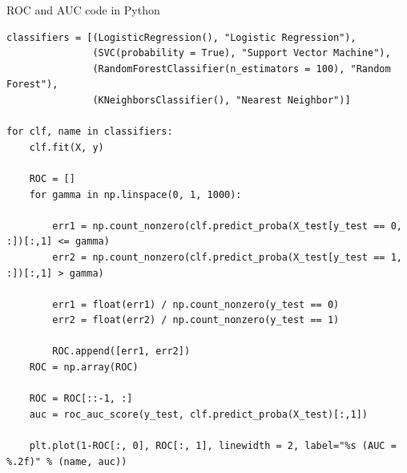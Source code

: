 \documentclass[10pt, aspectratio=169]{beamer} %
\begin{document}
\begin{frame}[allowframebreaks=0.8, fragile]{ROC and AUC code in Python}
\begin{lstlisting}
classifiers = [(LogisticRegression(), "Logistic Regression"),
               (SVC(probability = True), "Support Vector Machine"),
               (RandomForestClassifier(n_estimators = 100), "Random Forest"),
               (KNeighborsClassifier(), "Nearest Neighbor")]
        
for clf, name in classifiers:
    clf.fit(X, y)
    
    ROC = []
    for gamma in np.linspace(0, 1, 1000):
        
        err1 = np.count_nonzero(clf.predict_proba(X_test[y_test == 0, :])[:,1] <= gamma)
        err2 = np.count_nonzero(clf.predict_proba(X_test[y_test == 1, :])[:,1] > gamma)
    
        err1 = float(err1) / np.count_nonzero(y_test == 0)
        err2 = float(err2) / np.count_nonzero(y_test == 1)
        
        ROC.append([err1, err2])
    ROC = np.array(ROC)
    
    ROC = ROC[::-1, :]
    auc = roc_auc_score(y_test, clf.predict_proba(X_test)[:,1])
    
    plt.plot(1-ROC[:, 0], ROC[:, 1], linewidth = 2, label="%s (AUC = %.2f)" % (name, auc))
\end{lstlisting}
\vspace*{-1cm}
\end{frame}
%
%
\end{document}

